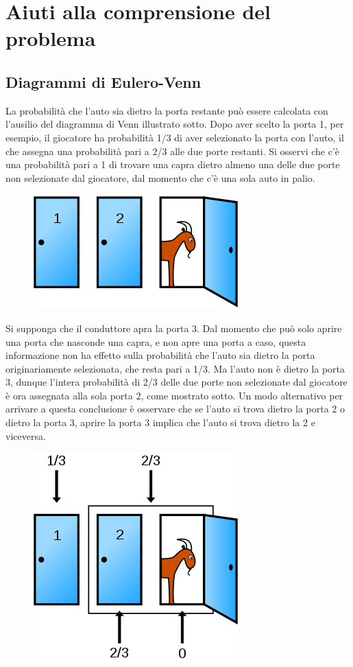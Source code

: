 \documentclass[a4paper, 12pt]{report}
\begin{document}
\chapter{Aiuti alla comprensione del problema}
\section{Diagrammi di Eulero-Venn}
La probabilità che l'auto sia dietro la porta restante può essere calcolata con l'ausilio del diagramma di Venn illustrato sotto. Dopo aver scelto la porta 1, per esempio, il giocatore ha probabilità 1/3 di aver selezionato la porta con l'auto, il che assegna una probabilità pari a 2/3 alle due porte restanti. Si osservi che c'è una probabilità pari a 1 di trovare una capra dietro almeno una delle due porte non selezionate dal giocatore, dal momento che c'è una sola auto in palio.

\begin{figure}[h]
	\centering
	\includegraphics[scale=0.5]{monty1}
\end{figure}

Si supponga che il conduttore apra la porta 3. Dal momento che può solo aprire una porta che nasconde una capra, e non apre una porta a caso, questa informazione non ha effetto sulla probabilità che l'auto sia dietro la porta originariamente selezionata, che resta pari a 1/3. Ma l'auto non è dietro la porta 3, dunque l'intera probabilità di 2/3 delle due porte non selezionate dal giocatore è ora assegnata alla sola porta 2, come mostrato sotto. Un modo alternativo per arrivare a questa conclusione è osservare che se l'auto si trova dietro la porta 2 o dietro la porta 3, aprire la porta 3 implica che l'auto si trova dietro la 2 e viceversa.

\begin{figure}[h]
	\centering
	\includegraphics[scale=0.5]{monty2}
\end{figure}
\end{document}
